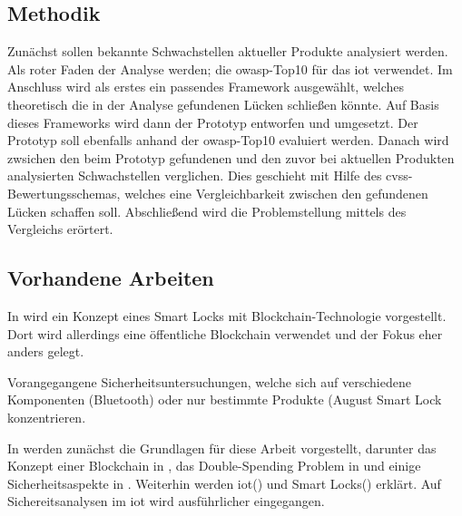     \subsection{Methodik}
    \label{sec:problem_methods}
        Zunächst sollen bekannte Schwachstellen aktueller Produkte analysiert werden.
        Als roter Faden der Analyse werden; die \gls{owasp}-Top10 für das \gls{iot}\cite{Miessler2015a} verwendet.
        Im Anschluss wird als erstes ein passendes Framework ausgewählt, welches theoretisch die in der Analyse gefundenen Lücken schließen könnte.
        Auf Basis dieses Frameworks wird dann der Prototyp entworfen und umgesetzt.
        Der Prototyp soll ebenfalls anhand der \gls{owasp}-Top10 evaluiert werden.
        Danach wird zwsichen den beim Prototyp gefundenen und den zuvor bei aktuellen Produkten analysierten Schwachstellen verglichen.
        Dies geschieht mit Hilfe des \gls{cvss}-Bewertungsschemas, welches eine Vergleichbarkeit zwischen den gefundenen Lücken schaffen soll.
        Abschließend wird die Problemstellung mittels des Vergleichs erörtert.
    
    \subsection{Vorhandene Arbeiten}
    \label{sec:problem_relatedWork}
        In \cite{Han2017} wird ein Konzept eines Smart Locks mit Blockchain-Technologie vorgestellt. 
        Dort wird allerdings eine öffentliche Blockchain verwendet und der Fokus eher anders gelegt. 
        
        Vorangegangene Sicherheitsuntersuchungen, welche sich auf verschiedene Komponenten (Bluetooth\cite{Rose2016}) oder nur bestimmte Produkte (August Smart Lock\cite{Fuller2017,Ho2016,Ye2017} konzentrieren.

	\vspace{3em}    
	\noindent In  werden zunächst die Grundlagen für diese Arbeit vorgestellt, darunter das Konzept einer Blockchain in , das Double-Spending Problem in  und einige Sicherheitsaspekte in .
	Weiterhin werden \gls{iot}() und Smart Locks() erklärt.
	Auf Sichereitsanalysen im \gls{iot} wird ausführlicher eingegangen.
